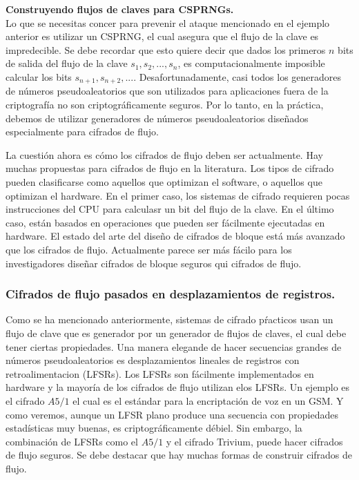 \documentclass{llncs}
\theoremstyle{plane}
\begin{document}
\textbf{Construyendo flujos de claves para CSPRNGs.} \\
Lo que se necesitas concer para prevenir el ataque mencionado en el ejemplo anterior es utilizar un CSPRNG, el cual asegura que el flujo de la clave es impredecible. Se debe recordar que esto quiere decir que dados los primeros $n$ bits de salida del flujo de la clave $s_{1}, s_{2}, ..., s_{n}$, es computacionalmente imposible calcular los bits $s_{n+1}, s_{n+2}, ...$. Desafortunadamente, casi todos los generadores de números pseudoaleatorios que son utilizados para aplicaciones fuera de la criptografía no son criptográficamente seguros. Por lo tanto, en la práctica, debemos de utilizar generadores de números pseudoaleatorios diseñados especialmente para cifrados de flujo.

La cuestión ahora es cómo los cifrados de flujo deben ser actualmente. Hay muchas propuestas para cifrados de flujo en la literatura. Los tipos de cifrado pueden clasificarse como aquellos que optimizan el software, o aquellos que optimizan el hardware. En el primer caso, los sistemas de cifrado requieren pocas instrucciones del CPU para calculasr un bit del flujo de la clave. En el último caso, están basados en operaciones que pueden ser fácilmente ejecutadas en hardware. El estado del arte del diseño de cifrados de bloque está más avanzado que los cifrados de flujo. Actualmente parece ser más fácilo para los investigadores diseñar cifrados de bloque seguros qui cifrados de flujo.


\subsubsection{Cifrados de flujo pasados en desplazamientos de registros.}

Como se ha mencionado anteriormente, sistemas de cifrado pŕacticos usan un flujo de clave que es generador por un generador de flujos de claves, el cual debe tener ciertas propiedades. Una manera elegande de hacer secuencias grandes de números pseudoaleatorios es desplazamientos lineales de registros con retroalimentacion (LFSRs). Los LFSRs son fácilmente implementados en hardware y la mayoría de los cifrados de flujo utilizan elos LFSRs. Un ejemplo es el cifrado $A5/1$ el cual es el estándar para la encriptación de voz en un GSM. Y como veremos, aunque  un LFSR plano produce una secuencia con propiedades estadísticas muy buenas, es criptográficamente débiel. Sin embargo,   la combinación de LFSRs como el $A5/1$ y el cifrado Trivium, puede hacer cifrados de flujo seguros. Se debe destacar que hay muchas formas de construir cifrados de flujo. 
\end{document}
